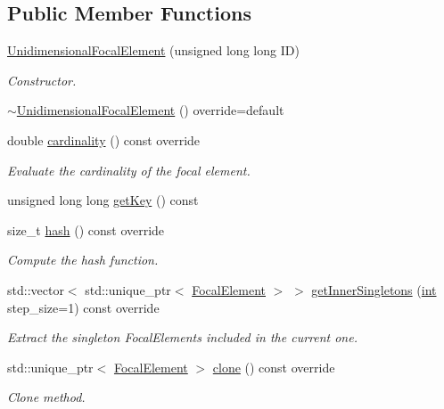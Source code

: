 \subsection*{Public Member Functions}
\begin{DoxyCompactItemize}
\item 
\hyperlink{classUnidimensionalFocalElement_a634c688c14ef7a5a561dedf62e4cb0c3}{Unidimensional\+Focal\+Element} (unsigned long long ID)
\begin{DoxyCompactList}\small\item\em Constructor. \end{DoxyCompactList}\item 
\hyperlink{classUnidimensionalFocalElement_a0750b8a513e6ca16fdb94ff8012b78de}{$\sim$\+Unidimensional\+Focal\+Element} () override=default
\item 
double \hyperlink{classUnidimensionalFocalElement_a22e013e2875cf07f23b3fe8ab2e2431f}{cardinality} () const override
\begin{DoxyCompactList}\small\item\em Evaluate the cardinality of the focal element. \end{DoxyCompactList}\item 
unsigned long long \hyperlink{classUnidimensionalFocalElement_a398bbc7cb6cabc000e549161323c3cf4}{get\+Key} () const 
\item 
size\+\_\+t \hyperlink{classUnidimensionalFocalElement_a073ce6e51cb7fff32b53e5f7b1d729c7}{hash} () const override
\begin{DoxyCompactList}\small\item\em Compute the hash function. \end{DoxyCompactList}\item 
std\+::vector$<$ std\+::unique\+\_\+ptr$<$ \hyperlink{classFocalElement}{Focal\+Element} $>$ $>$ \hyperlink{classUnidimensionalFocalElement_ad37dc12733140cfd631d451ebfefcaf7}{get\+Inner\+Singletons} (\hyperlink{CMakeCache_8txt_a79a3d8790b2588b09777910863574e09}{int} step\+\_\+size=1) const override
\begin{DoxyCompactList}\small\item\em Extract the singleton Focal\+Elements included in the current one. \end{DoxyCompactList}\item 
std\+::unique\+\_\+ptr$<$ \hyperlink{classFocalElement}{Focal\+Element} $>$ \hyperlink{classUnidimensionalFocalElement_aa06e27bc6c262783704883477d630d60}{clone} () const override
\begin{DoxyCompactList}\small\item\em Clone method. \end{DoxyCompactList}\item 

\end{DoxyCompactItemize}

